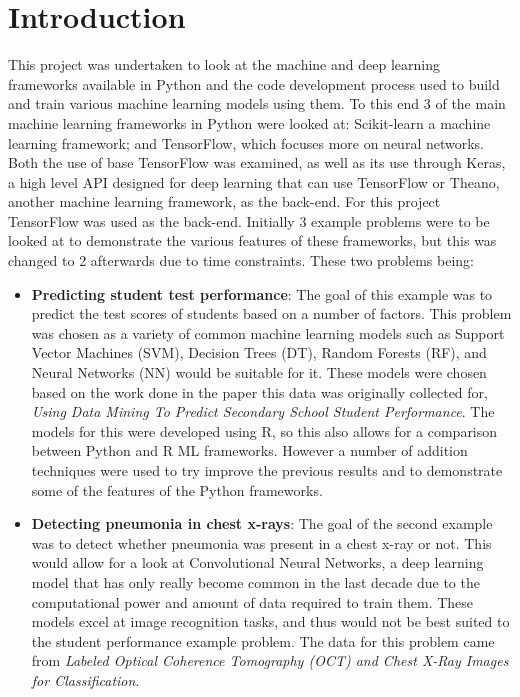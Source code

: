 \documentclass[12pt,a4paper,titlepage,twoside]{report}
\begin{document}
\chapter{Introduction}
	
	This project was undertaken to look at the machine and deep learning frameworks available in Python and the code development process used to build and train various machine learning models using them. To this end 3 of the main machine learning frameworks in Python were looked at: Scikit-learn\cite{scikit-learn} a machine learning framework; and TensorFlow\cite{tensorflow}, which focuses more on neural networks. Both the use of base TensorFlow was examined, as well as its use through Keras\cite{keras}, a high level API designed for deep learning that can use TensorFlow or Theano, another machine learning framework, as the back-end. For this project TensorFlow was used as the back-end. Initially 3 example problems were to be looked at to demonstrate the various features of these frameworks, but this was changed to 2 afterwards due to time constraints. These two problems being:
	\begin{itemize}
	\item \textbf{Predicting student test performance}: The goal of this example was to predict the test scores of students based on a number of factors. This problem was chosen as a variety of common machine learning models such as Support Vector Machines (SVM), Decision Trees (DT), Random Forests (RF), and Neural Networks (NN) would be suitable for it. These models were chosen based on the work done in the paper this data was originally collected for, \textit{Using Data Mining To Predict Secondary School Student Performance}\cite{student-dataset}. The models for this were developed using R, so this also allows for a comparison between Python and R ML frameworks. However a number of addition techniques were used to try improve the previous results and to demonstrate some of the features of the Python frameworks.
	\item \textbf{Detecting pneumonia in chest x-rays}: The goal of the second example was to detect whether pneumonia was present in a chest x-ray or not. This would allow for a look at Convolutional Neural Networks, a deep learning model that has only really become common in the last decade due to the computational power and amount of data required to train them. These models excel at image recognition tasks, and thus would not be best suited to the student performance example problem. The data for this problem came from \textit{Labeled Optical Coherence Tomography (OCT) and Chest X-Ray Images for Classification}\cite{pne-dataset}.
	\end{itemize}
\end{document}
